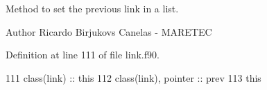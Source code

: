 Method to set the previous link in a list. 

\begin{DoxyAuthor}{Author}
Ricardo Birjukovs Canelas -\/ M\+A\+R\+E\+T\+EC 
\end{DoxyAuthor}


Definition at line 111 of file link.\+f90.


\begin{DoxyCode}
111     \textcolor{keywordtype}{class}(link) :: this
112     \textcolor{keywordtype}{class}(link), \textcolor{keywordtype}{pointer} :: prev
113     this%
\end{DoxyCode}
